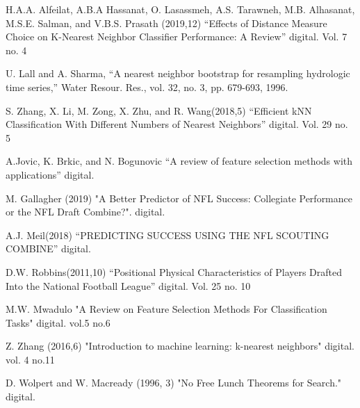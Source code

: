 \documentclass[confrence]{IEEEtran}
\begin{document}
H.A.A. Alfeilat, A.B.A Hassanat, O. Lasassmeh, A.S. Tarawneh, M.B. Alhasanat, M.S.E. Salman, and V.B.S. Prasath (2019,12) “Effects of Distance Measure Choice on K-Nearest Neighbor Classifier Performance: A Review” digital. Vol. 7 no. 4 

U. Lall and A. Sharma, “A nearest neighbor bootstrap for resampling
hydrologic time series,” Water Resour. Res., vol. 32, no. 3, pp. 679-693,
1996.

S. Zhang, X. Li, M. Zong, X. Zhu, and R. Wang(2018,5) “Efficient kNN Classification With Different Numbers of Nearest Neighbors” digital. Vol. 29 no. 5

A.Jovic, K. Brkic, and N. Bogunovic “A review of feature selection methods with applications” digital.

M. Gallagher (2019) "A Better Predictor of NFL Success: Collegiate Performance or the NFL Draft Combine?". digital. 

A.J. Meil(2018) “PREDICTING SUCCESS USING THE NFL SCOUTING COMBINE” digital. 

D.W. Robbins(2011,10) “Positional Physical Characteristics of Players Drafted Into the National Football League” digital. Vol. 25 no. 10 

M.W. Mwadulo "A Review on Feature Selection Methods For Classification Tasks" digital. vol.5 no.6

Z. Zhang (2016,6) "Introduction to machine learning: k-nearest neighbors" digital. vol. 4 no.11

D. Wolpert and W. Macready (1996, 3) "No Free Lunch Theorems for Search." digital. 
\end{document}
